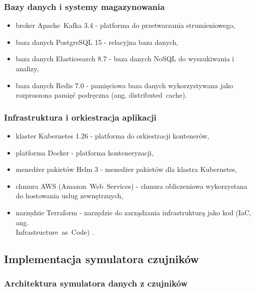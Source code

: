 \subsubsection{Bazy danych i systemy magazynowania}
\label{subsubsec:bazy_danych}

\begin{itemize}
    \item broker \mbox{Apache Kafka} 3.4 \cite{kafka} - platforma do przetwarzania strumieniowego,
    \item baza danych PostgreSQL 15 - relacyjna baza danych,
    \item baza danych Elasticsearch 8.7 - baza danych \mbox{NoSQL} \cite{nosql_definition} do wyszukiwania i analizy,
    \item baza danych Redis 7.0 - pamięciowa baza danych wykorzystywana jako rozproszona pamięć podręczna (ang. \mbox{distributed cache}).
\end{itemize}

\subsubsection{Infrastruktura i orkiestracja aplikacji}
\label{subsubsec:infrastruktura}

\begin{itemize}
    \item klaster Kubernetes 1.26 \cite{kubernetes} - platforma do orkiestracji kontenerów,
    \item platforma Docker - platforma konteneryzacji,
    \item menedżer pakietów Helm 3 - menedżer pakietów dla klastra Kubernetes,
    \item chmura AWS (\mbox{Amazon Web Services}) \cite{aws_definition} - chmura obliczeniowa wykorzystana do hostowania usług zewnętrznych,
    \item narzędzie Terraform - narzędzie do zarządzania infrastrukturą jako kod (IaC, ang. \\ \mbox{Infrastructure as Code}) \cite{terraform_docs}.
\end{itemize}

\subsection{Implementacja symulatora czujników}
\label{subsec:implementacja_symulatora}

\subsubsection{Architektura symulatora danych z czujników}
\label{subsubsec:architektura_symulatora}

